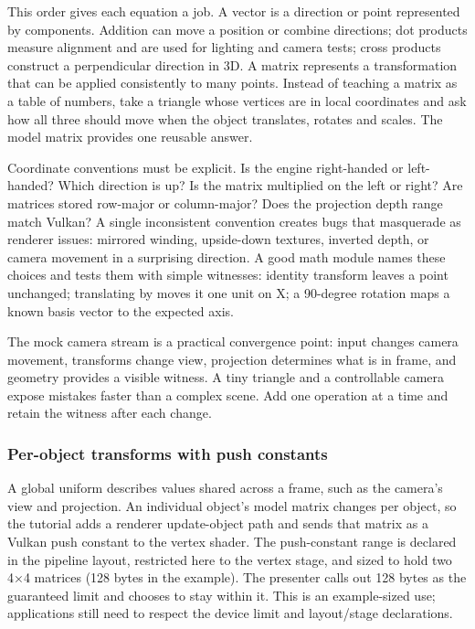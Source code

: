 This order gives each equation a job. A vector is a direction or point represented by components. Addition can move a position or combine directions; dot products measure alignment and are used for lighting and camera tests; cross products construct a perpendicular direction in 3D. A matrix represents a transformation that can be applied consistently to many points. Instead of teaching a matrix as a table of numbers, take a triangle whose vertices are in local coordinates and ask how all three should move when the object translates, rotates and scales. The model matrix provides one reusable answer.

Coordinate conventions must be explicit. Is the engine right-handed or left-handed? Which direction is up? Is the matrix multiplied on the left or right? Are matrices stored row-major or column-major? Does the projection depth range match Vulkan? A single inconsistent convention creates bugs that masquerade as renderer issues: mirrored winding, upside-down textures, inverted depth, or camera movement in a surprising direction. A good math module names these choices and tests them with simple witnesses: identity transform leaves a point unchanged; translating by  moves it one unit on X; a 90-degree rotation maps a known basis vector to the expected axis.

The mock camera stream is a practical convergence point: input changes camera movement, transforms change view, projection determines what is in frame, and geometry provides a visible witness. A tiny triangle and a controllable camera expose mistakes faster than a complex scene. Add one operation at a time and retain the witness after each change.

\subsubsection{Per-object transforms with push constants}\label{06-engine-ii-ch026-per-object-transforms-with-push-constants}

\hypertarget{06-engine-ii-ch026-per-object-transforms-with-push-constants}{}

A global uniform describes values shared across a frame, such as the camera's view and projection. An individual object's model matrix changes per object, so the tutorial adds a renderer update-object path and sends that matrix as a Vulkan push constant to the vertex shader. The push-constant range is declared in the pipeline layout, restricted here to the vertex stage, and sized to hold two 4×4 matrices (128 bytes in the example). The presenter calls out 128 bytes as the guaranteed limit and chooses to stay within it. This is an example-sized use; applications still need to respect the device limit and layout/stage declarations.

